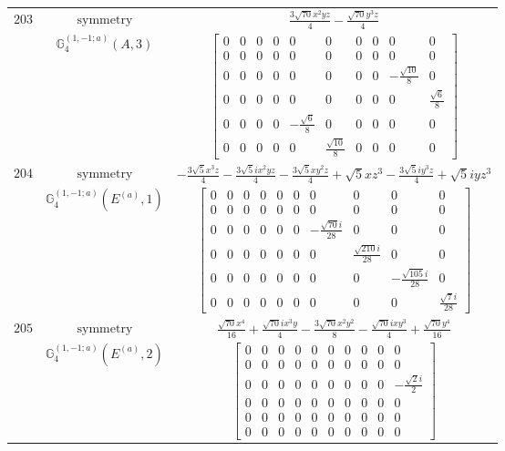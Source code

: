 \documentclass[fleqn,8pt,landscape]{jsarticle}
\begin{document}
\begin{longtable}{ccc}
$ 203 $ & $ \text{symmetry} $ & $ \frac{3 \sqrt{70} x^{2} y z}{4} - \frac{\sqrt{70} y^{3} z}{4} $ \\
$  $ & $ \mathbb{G}_{4}^{(1,-1;a)}(A,3) $ & $ \begin{bmatrix} 0 & 0 & 0 & 0 & 0 & 0 & 0 & 0 & 0 & 0 \\ 0 & 0 & 0 & 0 & 0 & 0 & 0 & 0 & 0 & 0 \\ 0 & 0 & 0 & 0 & 0 & 0 & 0 & 0 & - \frac{\sqrt{10}}{8} & 0 \\ 0 & 0 & 0 & 0 & 0 & 0 & 0 & 0 & 0 & \frac{\sqrt{6}}{8} \\ 0 & 0 & 0 & 0 & - \frac{\sqrt{6}}{8} & 0 & 0 & 0 & 0 & 0 \\ 0 & 0 & 0 & 0 & 0 & \frac{\sqrt{10}}{8} & 0 & 0 & 0 & 0 \end{bmatrix} $ \\ \hline
$ 204 $ & $ \text{symmetry} $ & $ - \frac{3 \sqrt{5} x^{3} z}{4} - \frac{3 \sqrt{5} i x^{2} y z}{4} - \frac{3 \sqrt{5} x y^{2} z}{4} + \sqrt{5} x z^{3} - \frac{3 \sqrt{5} i y^{3} z}{4} + \sqrt{5} i y z^{3} $ \\
$  $ & $ \mathbb{G}_{4}^{(1,-1;a)}(E^{(a)},1) $ & $ \begin{bmatrix} 0 & 0 & 0 & 0 & 0 & 0 & 0 & 0 & 0 & 0 \\ 0 & 0 & 0 & 0 & 0 & 0 & 0 & 0 & 0 & 0 \\ 0 & 0 & 0 & 0 & 0 & 0 & - \frac{\sqrt{70} i}{28} & 0 & 0 & 0 \\ 0 & 0 & 0 & 0 & 0 & 0 & 0 & \frac{\sqrt{210} i}{28} & 0 & 0 \\ 0 & 0 & 0 & 0 & 0 & 0 & 0 & 0 & - \frac{\sqrt{105} i}{28} & 0 \\ 0 & 0 & 0 & 0 & 0 & 0 & 0 & 0 & 0 & \frac{\sqrt{7} i}{28} \end{bmatrix} $ \\ \hline
$ 205 $ & $ \text{symmetry} $ & $ \frac{\sqrt{70} x^{4}}{16} + \frac{\sqrt{70} i x^{3} y}{4} - \frac{3 \sqrt{70} x^{2} y^{2}}{8} - \frac{\sqrt{70} i x y^{3}}{4} + \frac{\sqrt{70} y^{4}}{16} $ \\
$  $ & $ \mathbb{G}_{4}^{(1,-1;a)}(E^{(a)},2) $ & $ \begin{bmatrix} 0 & 0 & 0 & 0 & 0 & 0 & 0 & 0 & 0 & 0 \\ 0 & 0 & 0 & 0 & 0 & 0 & 0 & 0 & 0 & 0 \\ 0 & 0 & 0 & 0 & 0 & 0 & 0 & 0 & 0 & - \frac{\sqrt{2} i}{2} \\ 0 & 0 & 0 & 0 & 0 & 0 & 0 & 0 & 0 & 0 \\ 0 & 0 & 0 & 0 & 0 & 0 & 0 & 0 & 0 & 0 \\ 0 & 0 & 0 & 0 & 0 & 0 & 0 & 0 & 0 & 0 \end{bmatrix} $ \\ \hline

\end{longtable}
\end{document}
